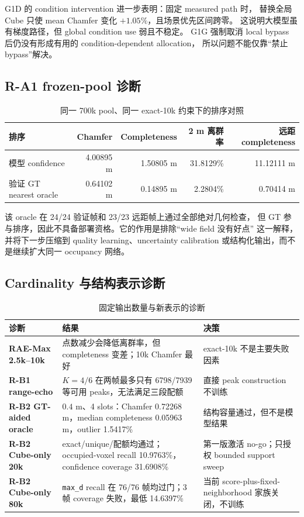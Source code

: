 \documentclass[11pt,a4paper,fontset=none]{ctexart}
\newcommand{\code}[1]{\texttt{#1}}
\begin{document}
G1D 的 condition intervention 进一步表明：固定 measured path 时，
替换全局 Cube 只使 mean Chamfer 变化 $+1.05\%$，且场景优先区间跨零。
这说明大模型虽有梯度路径，但 global condition use 弱且不稳定。
G1G 强制取消 local bypass 后仍没有形成有用的 condition-dependent allocation，
所以问题不能仅靠“禁止 bypass”解决。

\subsection{R-A1 frozen-pool 诊断}

\begin{table}[H]
\centering
\caption{同一 700k pool、同一 exact-10k 约束下的排序对照}
\begin{tabular}{lrrrr}
\toprule
排序 & Chamfer & Completeness & 2 m 离群率 & 远距 completeness \\
\midrule
模型 confidence & 4.00895 m & 1.50805 m & 31.8129\% & 11.12111 m \\
验证 GT nearest oracle & 0.64102 m & 0.14895 m & 2.2804\% & 0.70414 m \\
\bottomrule
\end{tabular}
\end{table}

该 oracle 在 24/24 验证帧和 23/23 远距帧上通过全部绝对几何检查，
但 GT 参与排序，因此不具备部署资格。它的作用是排除“wide field 没有好点”
这一解释，并将下一步压缩到 quality learning、uncertainty calibration
或结构化输出，而不是继续扩大同一 occupancy 网络。

\subsection{Cardinality 与结构表示诊断}

\begin{table}[H]
\centering
\small
\caption{固定输出数量与新表示的诊断}
\begin{tabularx}{\textwidth}{>{\bfseries}p{2.6cm} Y Y}
\toprule
诊断 & 结果 & 决策 \\
\midrule
RAE-Max 2.5k--10k & 点数减少会降低离群率，但 completeness 变差；10k Chamfer 最好 & exact-10k 不是主要失败因素 \\
R-B1 range-echo & $K=4/6$ 在两帧最多只有 6798/7939 等可用 peaks，无法满足三段配额 & 直接 peak construction 不训练 \\
R-B2 GT-aided oracle & $0.4$ m、4 slots：Chamfer 0.72268 m，median completeness 0.05963 m，outlier 1.5417\% & 结构容量通过，但不是模型结果 \\
R-B2 Cube-only 20k & exact/unique/配额均通过；occupied-voxel recall 10.9763\%，confidence coverage 31.6908\% & 第一版激活 no-go；只授权 bounded support sweep \\
R-B2 Cube-only 80k & \code{max\_d} recall 在 76/76 帧均过门；3 帧 coverage 失败，最低 14.6397\% & 当前 score-plus-fixed-neighborhood 家族关闭，不训练 \\
\bottomrule
\end{tabularx}
\end{table}
\end{document}
